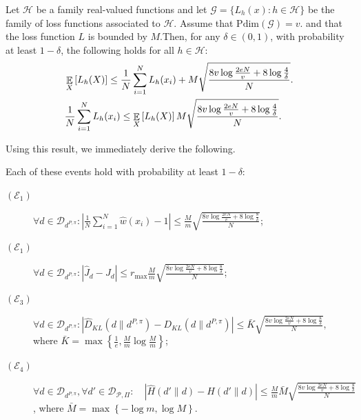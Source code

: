 \begin{theorem}
\label{thr:ermFinite}
	Let $\mathcal{H}$ be a family real-valued functions and let $\mathcal{G} = \{ L_h(x) : h \in \mathcal{H} \}$ be the family of loss functions associated to $\mathcal{H}$. Assume that $\mathrm{Pdim}(\mathcal{G}) = v$. and that the loss function $L$ is bounded by $M$.Then, for any $\delta \in (0,1)$, with probability at least $1 - \delta$, the following holds for all $h \in \mathcal{H}$:
	\begin{align}
		& \mathop{\mathbb{E}}_X \left[ L_h(X) \right] \le \frac{1}{N} \sum_{i=1}^N L_h(x_i) + M \sqrt{\frac{8v \log\frac{2eN}{v} + 8 \log \frac{4}{\delta}}{N}}. \\
		& \frac{1}{N} \sum_{i=1}^N L_h(x_i) \leq \mathop{\mathbb{E}}_X \left[ L_h(X) \right] M \sqrt{\frac{8v \log\frac{2eN}{v} + 8 \log \frac{4}{\delta}}{N}}. 
	\end{align}	
\end{theorem}

Using this result, we immediately derive the following.

\begin{lemma}
\label{lemma:bounds}
	Each of these events hold with probability at least $1-\delta$:
	\begin{description}
		\item[$\displaystyle (\mathcal{E}_1)$]
		$ \forall d \in \mathcal{D}_{d^{P,\pi}}:  \left| \frac{1}{N} \sum_{i=1}^N \widehat{w}(x_i) - 1 \right| \le \frac{M}{m} \sqrt{\frac{8v \log\frac{2eN}{v} + 8 \log \frac{8}{\delta}}{N}}	
		$;
		\item[$\displaystyle (\mathcal{E}_1)$]
		$ \forall d \in \mathcal{D}_{d^{P,\pi}}: \left| \widehat{J}_d - J_d \right| \le r_{\max} \frac{M}{m} \sqrt{\frac{8v \log\frac{2eN}{v} + 8 \log \frac{8}{\delta}}{N}}	
 		$;
		\item[$\displaystyle (\mathcal{E}_3)$] $
		  \forall d \in \mathcal{D}_{d^{P,\pi}}: \left| \widehat{D}_{KL}(d \| d^{P,\pi}) - D_{KL}(d \| d^{P,\pi}) \right| \le \bar{K} \sqrt{\frac{8v \log\frac{2eN}{v} + 8 \log \frac{8}{\delta}}{N}},$ where $\bar{K}=\max \left\{ \frac{1}{e}, \frac{M}{m} \log \frac{M}{m} \right\}$;
		\item[$\displaystyle (\mathcal{E}_4)$] $\forall d \in \mathcal{D}_{d^{P,\pi}}, \forall d' \in \mathcal{D}_{\mathcal{P},\Pi}: \quad \left| \widehat{H}(d' \| d) - H (d' \| d) \right| \le \frac{M}{m} \bar{M} \sqrt{\frac{8v \log\frac{2eN}{v} + 8 \log \frac{8}{\delta}}{N}}$, where $\bar{M}= \max \left\{ -\log m, \log M \right\}$.
	\end{description}
\end{lemma}

